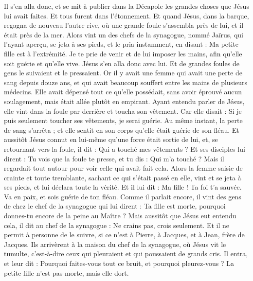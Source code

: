 \begin{multicols}{2}
Il s'en alla donc, et se mit à publier dans la Décapole les grandes choses que Jésus lui avait faites. Et tous furent dans l'étonnement.
Et quand Jésus, dans la barque, regagna de nouveau l'autre rive, où une grande foule s'assembla près de lui, et il était près de la mer.
Alors vint un des chefs de la synagogue, nommé Jaïrus, qui l'ayant aperçu, se jeta à ses pieds,
et le pria instamment, en disant : Ma petite fille est à l'extrémité. Je te prie de venir et de lui imposer les mains, afin qu'elle soit guérie et qu'elle vive.
Jésus s'en alla donc avec lui. Et de grandes foules de gens le suivaient et le pressaient.
Or il y avait une femme qui avait une perte de sang depuis douze ans,
et qui avait beaucoup souffert entre les mains de plusieurs médecins. Elle avait dépensé tout ce qu'elle possédait, sans avoir éprouvé aucun soulagement, mais était allée plutôt en empirant.
Ayant entendu parler de Jésus, elle vint dans la foule par derrière et toucha son vêtement.
Car elle disait : Si je puis seulement toucher ses vêtements, je serai guérie.
Au même instant, la perte de sang s'arrêta ; et elle sentit en son corps qu'elle était guérie de son fléau.
Et aussitôt Jésus connut en lui-même qu'une force était sortie de lui, et, se retournant vers la foule, il dit : Qui a touché mes vêtements ?
Et ses disciples lui dirent : Tu vois que la foule te presse, et tu dis : Qui m'a touché ?
Mais il regardait tout autour pour voir celle qui avait fait cela.
Alors la femme saisie de crainte et toute tremblante, sachant ce qui s'était passé en elle, vint et se jeta à ses pieds, et lui déclara toute la vérité.
Et il lui dit : Ma fille ! Ta foi t'a sauvée. Va en paix, et sois guérie de ton fléau.
Comme il parlait encore, il vint des gens de chez le chef de la synagogue qui lui dirent : Ta fille est morte, pourquoi donnes-tu encore de la peine au Maître ?
Mais aussitôt que Jésus eut entendu cela, il dit au chef de la synagogue : Ne crains pas, crois seulement.
Et il ne permit à personne de le suivre, si ce n'est à Pierre, à Jacques, et à Jean, frère de Jacques.
Ils arrivèrent à la maison du chef de la synagogue, où Jésus vit le tumulte, c'est-à-dire ceux qui pleuraient et qui poussaient de grands cris.
Il entra, et leur dit : Pourquoi faites-vous tout ce bruit, et pourquoi pleurez-vous ? La petite fille n'est pas morte, mais elle dort.

\end{multicols}
